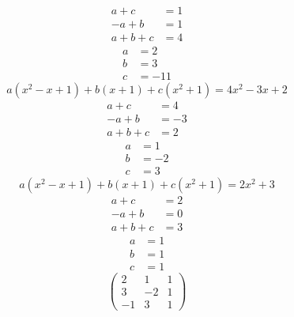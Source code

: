 \begin{enumerate}[(a)]
\begin{equation}
\end{equation}
\begin{align}
a +c &=1\\
-a + b &=1\\
a +b+c &=4
\end{align}
\begin{align}
a&=2\\
b&=3\\
c&=-11
\end{align}
\begin{equation}
a(x^2-x+1) + b(x+1) + c(x^2 + 1) = 4x^2 -3x +2
\end{equation}
\begin{align}
a+c&=4\\
-a+b&=-3\\
a+b+c&=2
\end{align}
\begin{align}
a&=1\\
b&=-2\\
c&=3
\end{align}
\begin{equation}
a(x^2-x+1) + b(x+1) + c(x^2 + 1) = 2x^2 +3
\end{equation}
\begin{align}
a+c&=2\\
-a+b&=0\\
a+b+c&=3
\end{align}
\begin{align}
a&=1\\
b&=1\\
c&=1
\end{align}
\begin{equation}
\begin{pmatrix}
2&1&1\\
3&-2&1\\
-1&3&1
\end{pmatrix}
\end{equation}
\end{enumerate}
